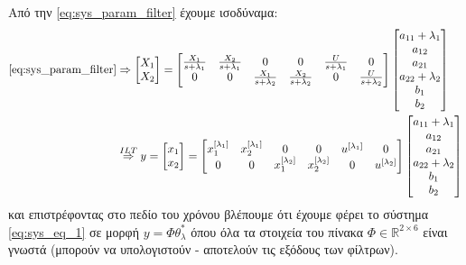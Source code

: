 \documentclass[12pt]{article} %
\numberwithin{equation}{section}  %
\begin{document}
Από την \eqref{eq:sys_param_filter} έχουμε ισοδύναμα:
\vspace{-\topsep}
\vspace{+3pt}
\begin{equation}\label{eq:sys_param_filter_2}
\begin{aligned}
        \eqref{eq:sys_param_filter} &\Rightarrow
        \begin{bmatrix}
            X_1 \\ X_2
        \end{bmatrix} = 
        \begin{bmatrix}
            \frac{X_1}{s + \lambda_1}  & \frac{X_2}{s + \lambda_1}  & 0 & 0 & \frac{U}{s + \lambda_1}  & 0 \\ 
            0 & 0 & \frac{X_1}{s + \lambda_2}  & \frac{X_2}{s + \lambda_2}  & 0 & \frac{U}{s + \lambda_2} \\ 
        \end{bmatrix}
        \begin{bmatrix}
            a_{11} + \lambda_1 \\ a_{12} \\ a_{21} \\ a_{22} + \lambda_2 \\ b_1 \\ b_2
        \end{bmatrix} \\
        &\overset{ILT}{\Rightarrow}
        y = \begin{bmatrix}
            x_1 \\ x_2
        \end{bmatrix} = 
        \begin{bmatrix}
            x^{[\lambda_1]}_1  & x^{[\lambda_1]}_2  & 0 & 0 & u^{[\lambda_1]}  & 0 \\ 
            0 & 0 & x^{[\lambda_2]}_1  & x^{[\lambda_2]}_2  & 0 & u^{[\lambda_2]} \\ 
        \end{bmatrix}
        \begin{bmatrix}
            a_{11} + \lambda_1 \\ a_{12} \\ a_{21} \\ a_{22} + \lambda_2 \\ b_1 \\ b_2
        \end{bmatrix}
\end{aligned}
\end{equation}
και επιστρέφοντας στο πεδίο του χρόνου βλέπουμε ότι έχουμε φέρει το σύστημα \eqref{eq:sys_eq_1} σε μορφή $y = \Phi \theta_{\lambda}^{*} $\textemdash 
όπου όλα τα στοιχεία του πίνακα $\Phi \in \mathbb{R}^{2 \times 6}$ είναι γνωστά (μπορούν να υπολογιστούν - αποτελούν τις εξόδους των φίλτρων).
\end{document}
